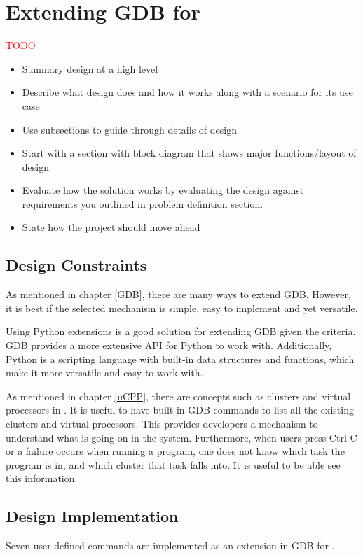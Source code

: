 \chapter{Extending GDB for \uCPP}

\textcolor{red}{TODO}
\begin{itemize}
\item Summary design at a high level
\item Describe what design does and how it works along with a scenario for its
use case
\item Use subsections to guide through details of design
\item Start with a section with block diagram that shows major functions/layout
of design
\item Evaluate how the solution works by evaluating the design against
requirements you outlined in problem definition section.
\item State how the project should move ahead
\end{itemize}

\section{Design Constraints}
As mentioned in chapter \ref{GDB}, there are many ways to extend GDB. However,
it is best if the selected mechanism is simple, easy to implement and yet
versatile.

Using Python extensions is a good solution for extending GDB given the criteria.
GDB provides a more extensive API for Python to work with. Additionally, Python
is a scripting language with built-in data structures and functions, which make
it more versatile and easy to work with.

As mentioned in chapter \ref{uCPP}, there are concepts such as clusters and
virtual processors in \uCPP. It is useful to have built-in GDB commands to list
all the existing clusters and virtual processors. This provides developers
a mechanism to understand what is going on in the system. Furthermore, when users
press Ctrl-C or a failure occurs when running a \uCPPS program, one does not
know which task the program is in, and which cluster that task falls into. It is
useful to be able see this information.

\section{Design Implementation}
Seven user-defined commands are implemented as an extension in GDB for \uCPP.
